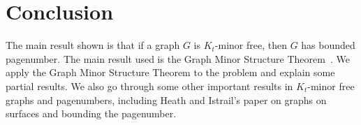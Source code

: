\chapter{Conclusion}\label{chap:conclusion}

The main result shown is that if a graph $G$ is $K_t$-minor free, then $G$ has bounded pagenumber.
The main result used is the Graph Minor Structure Theorem~\cite{robertsonGraphMinorsXVI2003}. We apply the Graph Minor Structure Theorem to the problem and explain some partial results.
We also go through some other important results in \(K_t\)-minor free graphs and pagenumbers, including Heath and Istrail's \cite{heathPagenumberGenusGraphs1992} paper on graphs on surfaces and bounding the pagenumber.